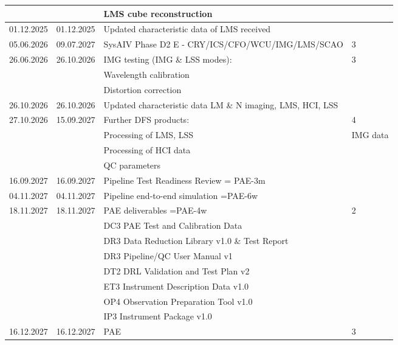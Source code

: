 \begin{table}
\begin{tabularx}{\textwidth}{llll}
    &          & LMS cube reconstruction                                      &	\\
\hline
01.12.2025 & 01.12.2025 &  Updated characteristic data of LMS received		  &   \\
05.06.2026 & 09.07.2027 & SysAIV Phase D2 E - CRY/ICS/CFO/WCU/IMG/LMS/SCAO            &   3 \\
26.06.2026 & 26.10.2026 & IMG testing (IMG \& LSS modes):                   &	3 \\
   &           & Wavelength calibration        	                           & \\   
   &           & Distortion correction                                        & \\
\hline
26.10.2026 & 26.10.2026 & Updated characteristic data LM \& N imaging, LMS, HCI, LSS      & 	\\
\hline
27.10.2026 & 15.09.2027 &	Further DFS products:		                      &	4 \\
    &          &  Processing of LMS, LSS & IMG data                           &	\\
    &          &  Processing of HCI data                                      &	\\
    &          &  QC parameters					            &	\\
\hline
16.09.2027 & 16.09.2027 & Pipeline Test Readiness Review = PAE-3m			  &	\\
\hline
04.11.2027 & 04.11.2027 & Pipeline end-to-end simulation  =PAE-6w			  &	\\
\hline
18.11.2027 & 18.11.2027 & PAE deliverables =PAE-4w                          &	2 \\
    &          &  DC3 PAE Test and Calibration Data                           &	\\
    &          &  DR3 Data Reduction Library v1.0 \& Test Report              &	\\
    &          &  DR3 Pipeline/QC User Manual v1                              &	\\
    &	       &  DT2 DRL Validation and Test Plan v2                         &	\\
    &      	   &  ET3 Instrument Description Data v1.0                        &	\\
    &   	   &  OP4 Observation Preparation Tool v1.0                       &	\\
    &	   	   &  IP3 Instrument Package v1.0	                			  &	\\
\hline
16.12.2027 & 16.12.2027 & PAE							    &	3 \\

\end{tabularx}
\end{table}
